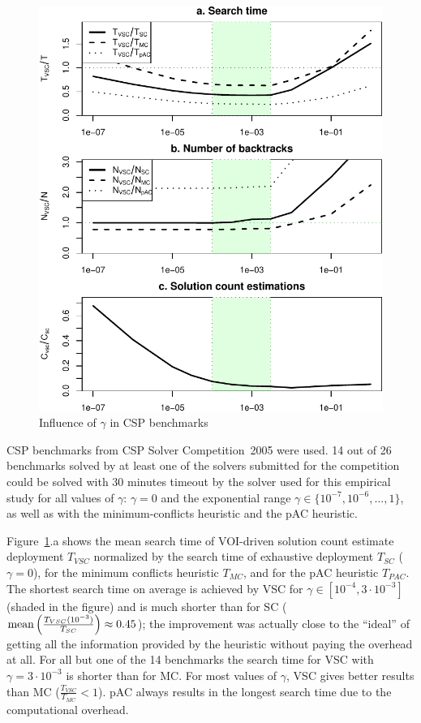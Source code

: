 \begin{figure}[h]
\centering
\includegraphics[scale=0.67]{csp-benchmarks.pdf}
\caption{Influence of $\gamma$ in CSP benchmarks}
\label{fig:benchmarks}
\end{figure}

CSP benchmarks from CSP Solver Competition~2005
\cite{Boussemart.benchmarks} were used. 14 out of 26 benchmarks
solved by at least one of the solvers submitted for the competition
could be solved with 30 minutes timeout by the solver used for this
empirical study for all values of $\gamma$: $\gamma=0$ and the
exponential range $\gamma \in \{10^{-7}, 10^{-6}, ..., 1\}$, as well
as with the minimum-conflicts heuristic and the pAC heuristic.

Figure~\ref{fig:benchmarks}.a shows the mean search time of VOI-driven
solution count estimate deployment $T_{VSC}$ normalized by the search
time of exhaustive deployment $T_{SC}$ ($\gamma=0$), for the minimum
conflicts heuristic $T_{MC}$, and for the pAC heuristic $T_{PAC}$.
The shortest search time on average is achieved by VSC for $\gamma \in
[10^{-4},3\cdot10^{-3}]$ (shaded in the figure) and is much shorter
than for SC ($\mathop{\mathrm{mean}} \left(\frac {T_{VSC}(10^{-3})}
{T_{SC}}\right)\approx 0.45$); the improvement was
  actually close to the ``ideal'' of getting all the information
  provided by the heuristic without paying the overhead at all. For
all but one of the 14 benchmarks the search time for VSC with
$\gamma=3\cdot10^{-3}$ is shorter than for MC. For most values of
$\gamma$, VSC gives better results than MC ($\frac {T_{VSC}} {T_{MC}}
< 1$). pAC always results in the longest search time due to the
computational overhead.


